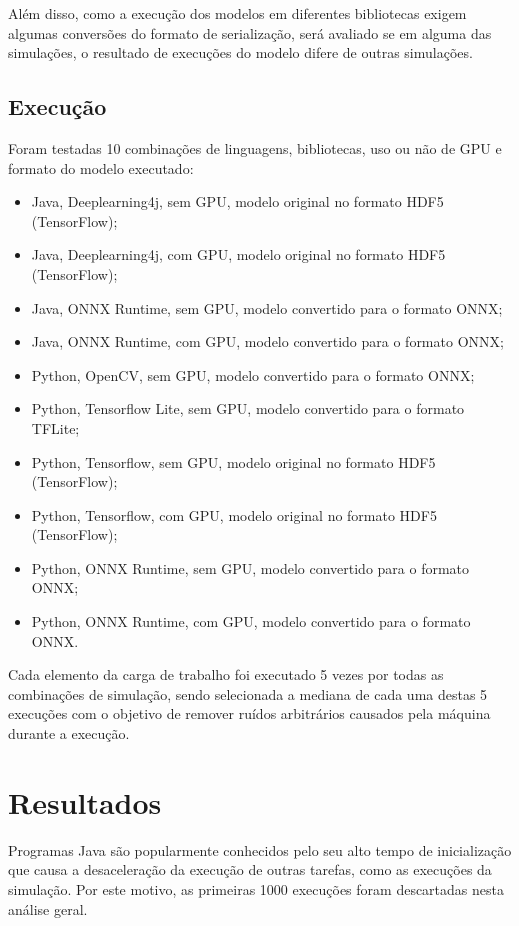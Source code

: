 Além disso, como a execução dos modelos em diferentes bibliotecas exigem algumas conversões do formato de serialização, será avaliado se em alguma das simulações, o resultado de execuções do modelo difere de outras simulações.

\subsection{Execução}

Foram testadas 10 combinações de linguagens, bibliotecas, uso ou não de GPU e formato do modelo executado:

\begin{itemize}
  \item Java, Deeplearning4j, sem GPU, modelo original no formato HDF5 (TensorFlow);
  \item Java, Deeplearning4j, com GPU, modelo original no formato HDF5 (TensorFlow);
  \item Java, ONNX Runtime, sem GPU, modelo convertido para o formato ONNX;
  \item Java, ONNX Runtime, com GPU, modelo convertido para o formato ONNX;
  \item Python, OpenCV, sem GPU, modelo convertido para o formato ONNX;
  \item Python, Tensorflow Lite, sem GPU, modelo convertido para o formato TFLite;
  \item Python, Tensorflow, sem GPU, modelo original no formato HDF5 (TensorFlow);
  \item Python, Tensorflow, com GPU, modelo original no formato HDF5 (TensorFlow);
  \item Python, ONNX Runtime, sem GPU, modelo convertido para o formato ONNX;
  \item Python, ONNX Runtime, com GPU, modelo convertido para o formato ONNX.
\end{itemize}

Cada elemento da carga de trabalho foi executado 5 vezes por todas as combinações de simulação, sendo selecionada a mediana de cada uma destas 5 execuções com o objetivo de remover ruídos arbitrários causados pela máquina durante a execução.

\section{Resultados}

Programas Java são popularmente conhecidos pelo seu alto tempo de inicialização que causa a desaceleração da execução de outras tarefas, como as execuções da simulação. Por este motivo, as primeiras 1000 execuções foram descartadas nesta análise geral.

